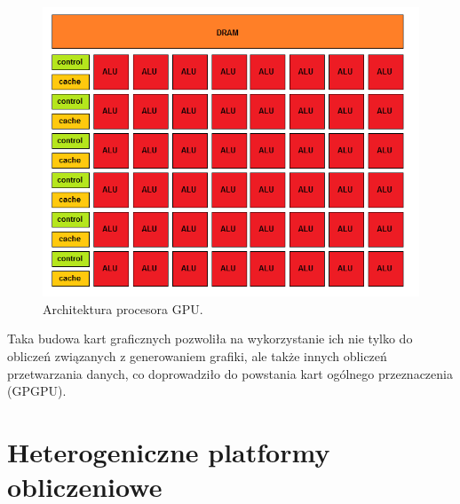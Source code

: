 \begin{figure}[h]
        \centering
                \centering
                \includegraphics[width=12cm]{rys7}
	\caption{Architektura procesora GPU.}
\end{figure}
Taka budowa kart graficznych pozwoliła na wykorzystanie ich nie tylko do obliczeń związanych z generowaniem grafiki, ale także innych obliczeń przetwarzania danych, co doprowadziło do powstania kart ogólnego przeznaczenia (GPGPU).




\section{Heterogeniczne platformy obliczeniowe}\label{sec:hetero}

